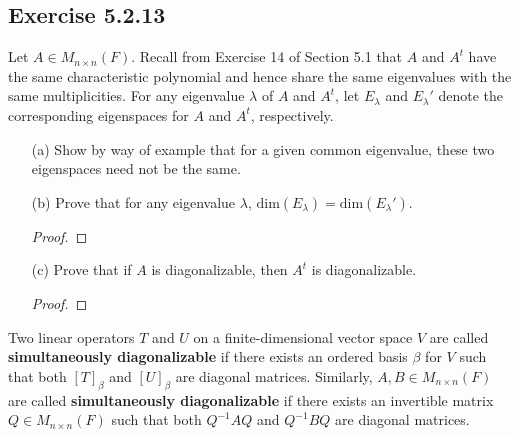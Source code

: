 \subsection*{Exercise 5.2.13} Let \( A \in {M}_{n \times n}(F)  \). Recall from Exercise 14 of Section 5.1 that \( A  \) and \( A^{t} \) have the same characteristic polynomial and hence share the same eigenvalues with the same multiplicities. For any eigenvalue \( \lambda  \) of \( A  \) and \( A^{t} \), let \( {E}_{\lambda} \) and \( {E}_{\lambda}' \) denote the corresponding eigenspaces for \( A  \) and \( A^{t} \), respectively.
\begin{enumerate}
    \item[(a)] Show by way of example that for a given common eigenvalue, these two eigenspaces need not be the same.
        \begin{solution}
        
        \end{solution}
    \item[(b)] Prove that for any eigenvalue \( \lambda  \), \( \text{dim}({E}_{\lambda}) = \text{dim}({E}_{\lambda}') \).
        \begin{proof}
        
        \end{proof}
    \item[(c)] Prove that if \( A  \) is diagonalizable, then \( A^{t}  \) is diagonalizable.
        \begin{proof}
        
        \end{proof}
\end{enumerate}

\begin{definition}
    Two linear operators \( T  \) and \( U  \) on a finite-dimensional vector space \( V  \) are called \textbf{simultaneously diagonalizable} if there exists an ordered basis \( \beta \) for \( V  \) such that both \( [T]_{\beta} \) and \( [U]_{\beta} \) are diagonal matrices. Similarly, \( A,B \in {M}_{n \times n}(F) \) are called \textbf{simultaneously diagonalizable} if there exists an invertible matrix \( Q \in {M}_{n \times n}(F) \) such that both \( Q^{-1} A Q  \) and \( Q^{-1} B Q   \) are diagonal matrices.
\end{definition} 

